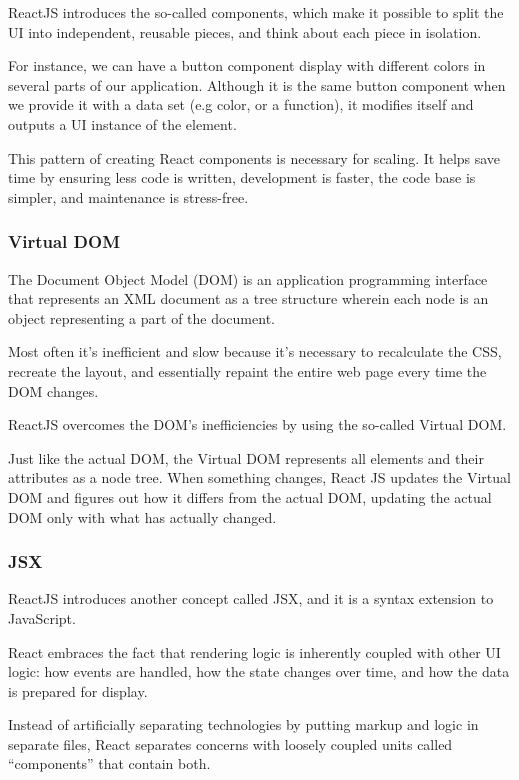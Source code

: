 \documentclass[a4paper]{article}
\numberwithin{equation}{section}
\begin{document}
ReactJS introduces the so-called components, which make it possible to split the UI into independent, reusable pieces, and think about each piece in isolation.

For instance, we can have a button component display with different colors in several parts of our application.
Although it is the same button component when we provide it with a data set (e.g color, or a function), it modifies itself and outputs a UI instance of the element.

This pattern of creating React components is necessary for scaling.
It helps save time by ensuring less code is written, development is faster, the code base is simpler, and maintenance is stress-free.

\subsubsection{Virtual DOM}
The Document Object Model (DOM) is an application programming interface that represents an XML document as a tree structure wherein each node is an object representing a part of the document.

Most often it’s inefficient and slow because it’s necessary to recalculate the CSS, recreate the layout, and essentially repaint the entire web page every time the DOM changes.

ReactJS overcomes the DOM’s inefficiencies by using the so-called Virtual DOM\@.

Just like the actual DOM, the Virtual DOM represents all elements and their attributes as a node tree.
When something changes, React JS updates the Virtual DOM and figures out how it differs from the actual DOM, updating the actual DOM only with what has actually changed.

\subsubsection{JSX}
ReactJS introduces another concept called JSX, and it is a syntax extension to JavaScript.

React embraces the fact that rendering logic is inherently coupled with other UI logic: how events are handled, how the state changes over time, and how the data is prepared for display.

Instead of artificially separating technologies by putting markup and logic in separate files, React separates concerns with loosely coupled units called “components” that contain both.
\end{document}
